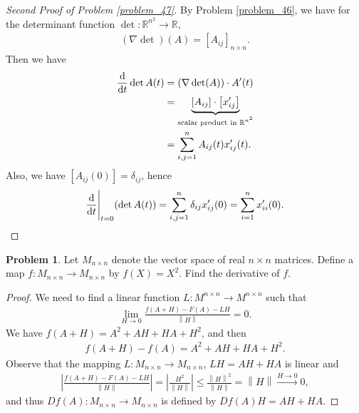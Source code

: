 \documentclass[11pt]{article}
\theoremstyle{definition}
\newtheorem{problem}{Problem}
\theoremstyle{definition}
\begin{document}
\begin{proof}[Second Proof of Problem \ref{problem_47}]
By Problem \ref{problem_46}, we have for the determinant function $\det: \mathbb{R}^{n^2} \to \mathbb{R}$,
\begin{align*}
    (\nabla \det)(A) = \left[A_{ij}\right]_{n\times n}.
\end{align*}
Then we have 
\begin{align*}
    \dv{}{t} \det A(t) & = (\nabla \det(A))\cdot A'(t) \\
    & =  \underbrace{\left[A_{ij}\right]\cdot \left[x_{ij}'\right]}_{\text{scalar product in $\mathbb{R}^{n^2}$}} \\
    & = \sum^n_{i,j = 1} A_{ij}(t) x_{ij}'(t).
\end{align*}
Also, we have $\left[A_{ij}(0)\right] = \delta_{ij}$, hence 
\begin{align*}
    \dv{}{t}\Bigg|_{t=0}(\det A(t)) = \sum^n_{i,j = 1} \delta_{ij} x_{ij}'(0) = \sum_{i=1}^n x_{ii}'(0).
\end{align*}
\end{proof}


\medskip

\begin{problem}
Let $M_{n\times n}$ denote the vector space of real $n\times n$ matrices.
Define a map $f:M_{n\times n}\to M_{n\times n}$ by $f(X)=X^2$.
Find the derivative of $f$.
\end{problem}
\begin{proof}
We need to find a linear function $L: M^{n \times n} \to M^{n \times n}$ such that 
\begin{align*}
    \lim_{H \to 0} \frac{f(A + H) - F(A) - LH}{\left\| H \right\|} = 0.
\end{align*}
We have $f(A + H) = A^2 + AH + HA + H^2$, and then 
\begin{align*}
    f(A + H) - f(A)= A^2 + AH + HA + H^2.
\end{align*}
Observe that the mapping $L: M_{n\times n}\to M_{n\times n}$, $LH = AH + HA$ is linear and 
\begin{align*}
    \left|\frac{f(A + H) - F(A) - LH}{\left\| H \right\|} \right| = \left| \frac{H^2}{\left\| H \right\|} \right| \leq \frac{\left\| H \right\|^2}{\left\| H \right\|} = \left\| H \right\| \xrightarrow{H \to 0} 0, 
\end{align*}
and thus $Df(A): M_{n\times n}\to M_{n\times n}$ is defined by $Df(A)H = AH + HA$.
\end{proof}

\medskip
\end{document}
